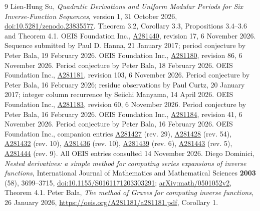 \documentclass[11pt]{article}
\begin{document}
\begin{thebibliography}{9}
Lien-Hung Su, \emph{Quadratic Derivations and Uniform Modular Periods for Six
Inverse-Function Sequences}, version 1, 31 October 2026,
\href{https://doi.org/10.5281/zenodo.23835577}{doi:10.5281/zenodo.23835577}.
Theorem 3.2, Corollary 3.3, Propositions 3.4--3.6 and Theorem 4.1.
OEIS Foundation Inc., \href{https://oeis.org/A281440}{A281440}, revision 17,
6 November 2026. Sequence submitted by Paul D. Hanna, 21 January 2017;
period conjecture by Peter Bala, 19 February 2026.
OEIS Foundation Inc., \href{https://oeis.org/A281180}{A281180}, revision 86,
6 November 2026. Period conjecture by Peter Bala, 18 February 2026.
OEIS Foundation Inc., \href{https://oeis.org/A281181}{A281181}, revision 103,
6 November 2026. Period conjecture by Peter Bala, 16 February 2026;
residue observations by Paul Curtz, 20 January 2017;
integer column recurrence by Seiichi Manyama, 14 April 2026.
OEIS Foundation Inc., \href{https://oeis.org/A281183}{A281183}, revision 60,
6 November 2026. Period conjecture by Peter Bala, 16 February 2026.
OEIS Foundation Inc., \href{https://oeis.org/A281184}{A281184}, revision 41,
6 November 2026. Period conjecture by Peter Bala, 16 February 2026.
OEIS Foundation Inc., companion entries
\href{https://oeis.org/A281427}{A281427} (rev. 29),
\href{https://oeis.org/A281428}{A281428} (rev. 54),
\href{https://oeis.org/A281432}{A281432} (rev. 10),
\href{https://oeis.org/A281436}{A281436} (rev. 10),
\href{https://oeis.org/A281439}{A281439} (rev. 6),
\href{https://oeis.org/A281443}{A281443} (rev. 5),
\href{https://oeis.org/A281444}{A281444} (rev. 9).
All OEIS entries consulted 14 November 2026.
Diego Dominici, \emph{Nested derivatives: a simple method for computing
series expansions of inverse functions}, International Journal of Mathematics
and Mathematical Sciences \textbf{2003} (58), 3699--3715,
\href{https://doi.org/10.1155/S0161171203303291}{doi:10.1155/S0161171203303291};
\href{https://arxiv.org/abs/math/0501052v2}{arXiv:math/0501052v2}, Theorem 4.1.
Peter Bala, \emph{The method of Graves for computing inverse functions},
26 January 2026,
\url{https://oeis.org/A281181/a281181.pdf}, Corollary 1.
\end{thebibliography}
\end{document}
